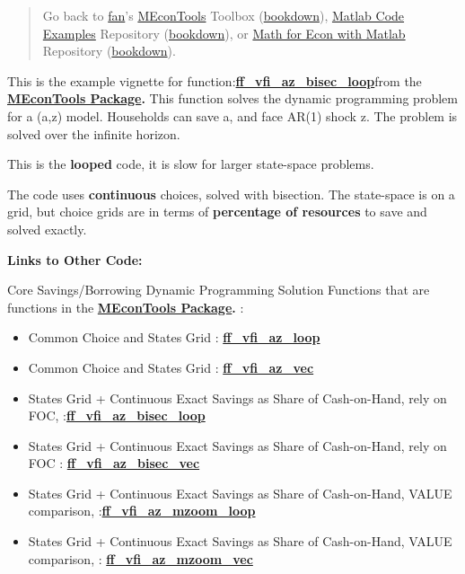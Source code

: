 \documentclass[
]{book}
\begin{document}
\begin{quote}
Go back to \href{http://fanwangecon.github.io/}{fan}'s \href{https://fanwangecon.github.io/MEconTools/}{MEconTools} Toolbox (\href{https://fanwangecon.github.io/MEconTools/bookdown}{bookdown}), \href{https://fanwangecon.github.io/M4Econ/}{Matlab Code Examples} Repository (\href{https://fanwangecon.github.io/M4Econ/bookdown}{bookdown}), or \href{https://fanwangecon.github.io/Math4Econ/}{Math for Econ with Matlab} Repository (\href{https://fanwangecon.github.io/Math4Econ/bookdown}{bookdown}).
\end{quote}

This is the example vignette for function:\href{https://github.com/FanWangEcon/MEconTools/blob/master/MEconTools/vfi/ff_vfi_az_bisec_loop.m}{\textbf{ff\_vfi\_az\_bisec\_loop}}from
the \href{https://fanwangecon.github.io/MEconTools/}{\textbf{MEconTools
Package}}\textbf{.} This function
solves the dynamic programming problem for a (a,z) model. Households can
save a, and face AR(1) shock z. The problem is solved over the infinite
horizon.

This is the \textbf{looped} code, it is slow for larger state-space problems.

The code uses \textbf{continuous} choices, solved with bisection. The
state-space is on a grid, but choice grids are in terms of \textbf{percentage
of resources} to save and solved exactly.

\textbf{Links to Other Code:}

Core Savings/Borrowing Dynamic Programming Solution Functions that are
functions in the \href{https://fanwangecon.github.io/MEconTools/}{\textbf{MEconTools
Package}}\textbf{.} :

\begin{itemize}
\item
  Common Choice and States Grid :
  \href{https://github.com/FanWangEcon/MEconTools/blob/master/MEconTools/vfi/ff_vfi_az_loop.m}{\textbf{ff\_vfi\_az\_loop}}
\item
  Common Choice and States Grid :
  \href{https://github.com/FanWangEcon/MEconTools/blob/master/MEconTools/vfi/ff_vfi_az_vec.m}{\textbf{ff\_vfi\_az\_vec}}
\item
  States Grid + Continuous Exact Savings as Share of Cash-on-Hand,
  rely on FOC, :\href{https://github.com/FanWangEcon/MEconTools/blob/master/MEconTools/vfi/ff_vfi_az_bisec_loop.m}{\textbf{ff\_vfi\_az\_bisec\_loop}}
\item
  States Grid + Continuous Exact Savings as Share of Cash-on-Hand,
  rely on FOC :
  \href{https://github.com/FanWangEcon/MEconTools/blob/master/MEconTools/vfi/ff_vfi_az_bisec_vec.m}{\textbf{ff\_vfi\_az\_bisec\_vec}}
\item
  States Grid + Continuous Exact Savings as Share of Cash-on-Hand,
  VALUE comparison, :\href{https://github.com/FanWangEcon/MEconTools/blob/master/MEconTools/vfi/ff_vfi_az_mzoom_loop.m}{\textbf{ff\_vfi\_az\_mzoom\_loop}}
\item
  States Grid + Continuous Exact Savings as Share of Cash-on-Hand,
  VALUE comparison, :
  \href{https://github.com/FanWangEcon/MEconTools/blob/master/MEconTools/vfi/ff_vfi_az_mzoom_vec.m}{\textbf{ff\_vfi\_az\_mzoom\_vec}}
\end{itemize}
\end{document}
